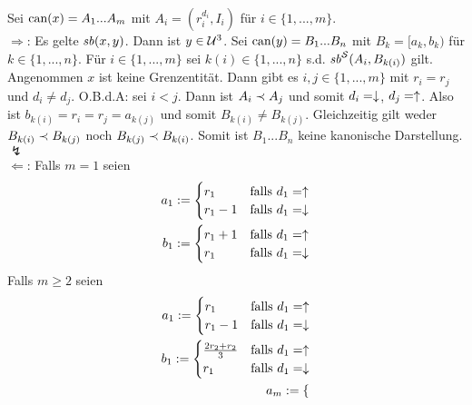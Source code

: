 \begin{bew}
    Sei $\text{can}(x) = A_1 ... A_m$ mit $A_i = (r_i^{d_i}, I_i)$ für $i \in \{1, ..., m\}$.\\
    $\boldsymbol{\Rightarrow}$: 
    Es gelte $\mathit{sb}(x,y)$.
    Dann ist $y \in \mathcal{U}^3$.
    Sei $\text{can}(y) = B_1 ... B_n$ mit $B_k = [a_k,b_k)$ für $k \in \{1, ..., n\}$.
    Für $i \in \{1, ..., m\}$ sei $k(i) \in \{1, ..., n\}$ s.d. $\mathit{sb}^{\mathcal{S}}(A_i,B_{k(i)})$ gilt.
    Angenommen $x$ ist keine Grenzentität.
    Dann gibt es $i,j \in \{1, ..., m\}$ mit $r_i = r_j$ und $d_i \neq d_j$. O.B.d.A: sei $i<j$. Dann ist $A_i \prec A_j$ und somit $d_i = \downarrow$, $d_j = \uparrow$.
    Also ist $b_{k(i)} = r_i = r_j = a_{k(j)}$ und somit $B_{k(i)} \neq B_{k(j)}$. Gleichzeitig gilt weder $B_{k(i)} \prec B_{k(j)}$ noch $B_{k(j)} \prec B_{k(i)}$. 
    Somit ist $B_1 ... B_n$ keine kanonische Darstellung. $\lightning$\\
    $\boldsymbol{\Leftarrow}$:
    Falls $m=1$ seien
    \begin{align*}
        a_1 := 
            \begin{cases}
                r_1 & \text{falls $d_1 = \uparrow$}\\
                r_1-1 & \text{falls $d_1 = \downarrow$}
            \end{cases}\\
        b_1 := 
            \begin{cases}
                r_1+1 & \text{falls $d_1 = \uparrow$}\\
                r_1 & \text{falls $d_1 = \downarrow$}
            \end{cases}\\
    \end{align*}
    Falls $m \geq 2$ seien
    \begin{align*}
        a_1 := 
            \begin{cases}
                r_1 & \text{falls $d_1 = \uparrow$}\\
                r_1-1 & \text{falls $d_1 = \downarrow$}
            \end{cases}\\
        b_1 := 
            \begin{cases}
                \frac{2r_2 + r_2}{3} & \text{falls $d_1 = \uparrow$}\\
                r_1 & \text{falls $d_1 = \downarrow$}
            \end{cases}\\
        a_m := 
            \begin{cases}

\end{cases}
\end{align*}
\end{bew}
